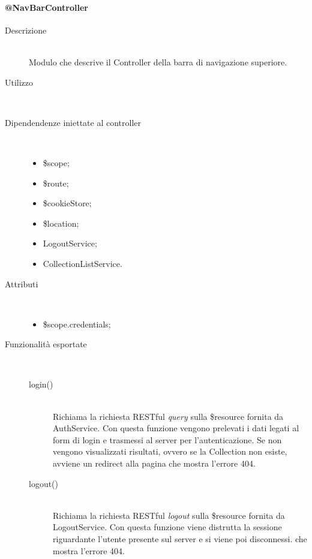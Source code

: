 \paragraph{@NavBarController}
\begin{description}
 \item[Descrizione] \hfill \\
 Modulo che descrive il Controller della barra di navigazione superiore.
 
 \item[Utilizzo] \hfill \\
 
 \item[Dipendendenze iniettate al controller] \hfill \\
 \begin{itemize}
  \item \$scope;
  \item \$route;
  \item \$cookieStore;
  \item \$location;
  \item LogoutService;
  \item CollectionListService.
  
 \end{itemize}
 
 \item[Attributi] \hfill \\
 \begin{itemize}
 \item  \$scope.credentials;

 \end{itemize}
 
 \item[Funzionalità esportate] \hfill \\
 \begin{description}
  \item[login()] \hfill \\
  Richiama la richiesta RESTful \textit{query} sulla \$resource fornita da AuthService.
  Con questa funzione vengono prelevati i dati legati al form di login e trasmessi al server per l'autenticazione.
	Se non vengono visualizzati risultati, ovvero se la Collection non esiste, avviene un redirect alla pagina
  che mostra l'errore 404. 
  	\item[logout()] \hfill \\
  Richiama la richiesta RESTful \textit{logout} sulla \$resource fornita da LogoutService.
  Con questa funzione viene distrutta la sessione riguardante l'utente presente sul server e si viene poi disconnessi.
  che mostra l'errore 404. 
 \end{description}
\end{description}

